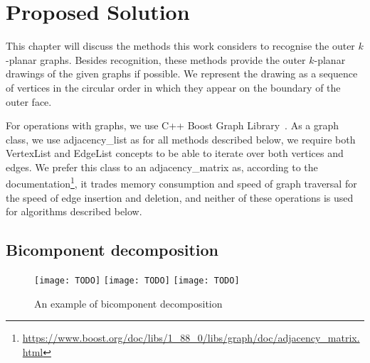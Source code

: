 \chapter{Proposed Solution}\label{ch:proposed-solution}

This chapter will discuss the methods this work considers to recognise the outer \(k\)-planar graphs. Besides recognition, these methods provide the outer \(k\)-planar drawings of the given graphs if possible. We represent the drawing as a sequence of vertices in the circular order in which they appear on the boundary of the outer face.

For operations with graphs, we use C++ Boost Graph Library~\cite{boost}. As a graph class, we use \textsf{adjacency\_list} as for all methods described below, we require both \textsf{VertexList} and \textsf{EdgeList} concepts to be able to iterate over both vertices and edges. We prefer this class to an \textsf{adjacency\_matrix} as, according to the documentation\footnote{\url{https://www.boost.org/doc/libs/1_88_0/libs/graph/doc/adjacency_matrix.html}}, it trades memory consumption and speed of graph traversal for the speed of edge insertion and deletion, and neither of these operations is used for algorithms described below.



\section{Bicomponent decomposition}

\begin{figure}
    \centering
     {
        \texttt{[image: TODO]}
    }
    \hfill
     {
        \texttt{[image: TODO]}
    }
    \hfill
    \hfill
     {
        \texttt{[image: TODO]}
    }
    \caption{An example of bicomponent decomposition}
\end{figure}

